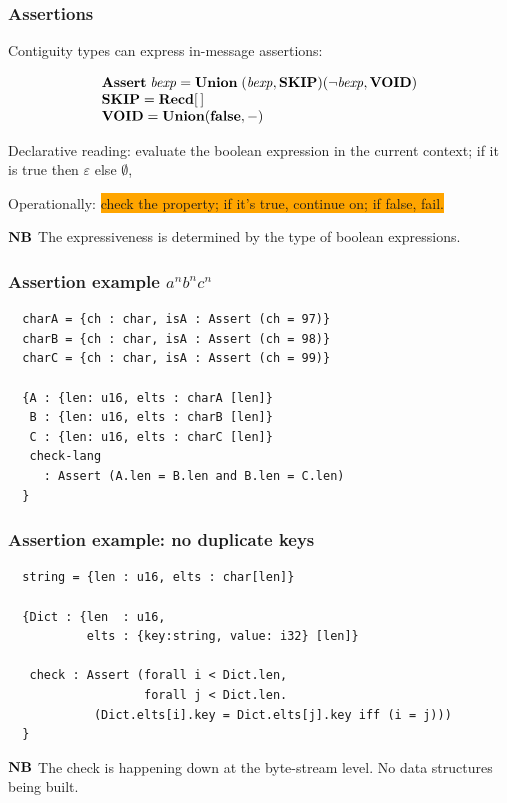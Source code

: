 \documentclass{beamer}
\newcommand{\kemph}[1]{\colorbox{orange}{#1}}
\newcommand{\konst}[1]{\ensuremath{\mbox{\bf{#1}}}}
\begin{document}
\begin{frame}\frametitle{Assertions}

Contiguity types can express in-message assertions:

\[
\begin{array}{l}
\konst{Assert}\;\mathit{bexp}  =
\konst{Union}\; (\mathit{bexp}, \konst{SKIP})  (\neg\mathit{bexp}, \konst{VOID}) \\

\konst{SKIP}  =  \konst{Recd} [\, ] \\
\konst{VOID}  =  \konst{Union} (\konst{false}, -)
\end{array}
\]

Declarative reading: evaluate the boolean expression in the current context;
  if it is true then $\varepsilon$ else $\emptyset$,

Operationally: \kemph{check the property; if it's true, continue on; if false, fail.}

\konst{NB} The expressiveness is determined by the type of boolean expressions.

\end{frame}

\begin{frame}[fragile]\frametitle{Assertion example $a^n b^n c^n$}


{\small
\begin{verbatim}
  charA = {ch : char, isA : Assert (ch = 97)}
  charB = {ch : char, isA : Assert (ch = 98)}
  charC = {ch : char, isA : Assert (ch = 99)}

  {A : {len: u16, elts : charA [len]}
   B : {len: u16, elts : charB [len]}
   C : {len: u16, elts : charC [len]}
   check-lang
     : Assert (A.len = B.len and B.len = C.len)
  }
\end{verbatim}
}

\end{frame}



\begin{frame}[fragile]\frametitle{Assertion example: no duplicate keys}


{\small
\begin{verbatim}
  string = {len : u16, elts : char[len]}

  {Dict : {len  : u16,
           elts : {key:string, value: i32} [len]}

   check : Assert (forall i < Dict.len,
                   forall j < Dict.len.
            (Dict.elts[i].key = Dict.elts[j].key iff (i = j)))
  }
\end{verbatim}
}

\konst{NB} The check is happening down at the byte-stream level. No
data structures being built.

\end{frame}
\end{document}
